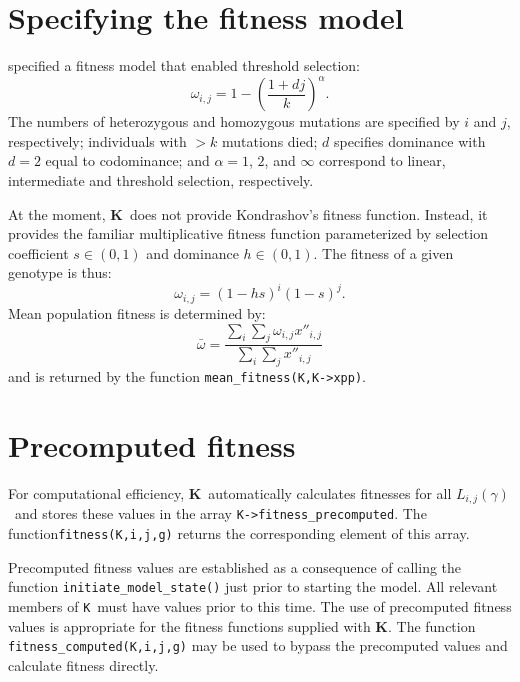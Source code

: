 \documentclass[10pt,twoside,a4paper,fleqn]{report}
\numberwithin{equation}{section}  %
\newcommand{\K}{{\bf K}}
\newcommand{\KK}{\mbox{{\tt K}}}  %
\newcommand{\KScalar}{\mbox{\tt KScalar}}
\newcommand{\xppij}{\mbox{$x''_{i,j}$}}
\newcommand{\Lijg}{\mbox{$L_{i,j}(\gamma)$}}     %
\begin{document}
{%
\section{Specifying the fitness model}


\citet{Kondrashov:1985:5375} specified a fitness model that enabled threshold selection:
\begin{equation}\label{eqn:kondrashovfitness}
\omega_{i,j}=1-\left({\frac{1+dj}{k}}\right)^\alpha.
\end{equation}
The numbers of heterozygous and homozygous mutations are specified by $i$ and $j$, respectively; individuals with $>k$ mutations died; $d$ specifies dominance with $d=2$ equal to codominance; and $\alpha=1$, $2$, and $\infty$ correspond to linear, intermediate and threshold selection, respectively.

At the moment, \K\ does not provide Kondrashov's fitness function.  Instead, it provides the familiar multiplicative fitness function parameterized by selection coefficient $s\in(0,1)$ and dominance $h\in(0,1)$.  The fitness of a given genotype is thus:
\begin{equation}\label{eq:fitnessmultiplicative}
\omega_{i,j}=(1-hs)^{i}(1-s)^{j}.
\end{equation}
Mean population fitness is determined by:
\begin{equation}\label{eq:meanfitness}
\bar{\omega}=\frac{\sum_i{\sum_j{\omega_{i,j}\xppij}}}{\sum_i{\sum_j{\xppij}}}
\end{equation}
and is returned by the function \lstinline{mean_fitness(K,K->xpp)}.

\section{Precomputed fitness}
\label{section:precomputedfitness}

For computational efficiency, \K\ automatically calculates fitnesses for all \Lijg\ and stores these values in the array \lstinline{K->fitness_precomputed}.  The function\linebreak \lstinline{fitness(K,i,j,g)} returns the corresponding element of this array.

Precomputed fitness values are established as a consequence of calling the function \lstinline{initiate_model_state()} just prior to starting the model.  All relevant members of \KK\ must have values prior to this time.  The use of precomputed fitness values is appropriate for the fitness functions supplied with \K.  The function \lstinline{fitness_computed(K,i,j,g)} may be used to bypass the precomputed values and calculate fitness directly.

}
\end{document}
